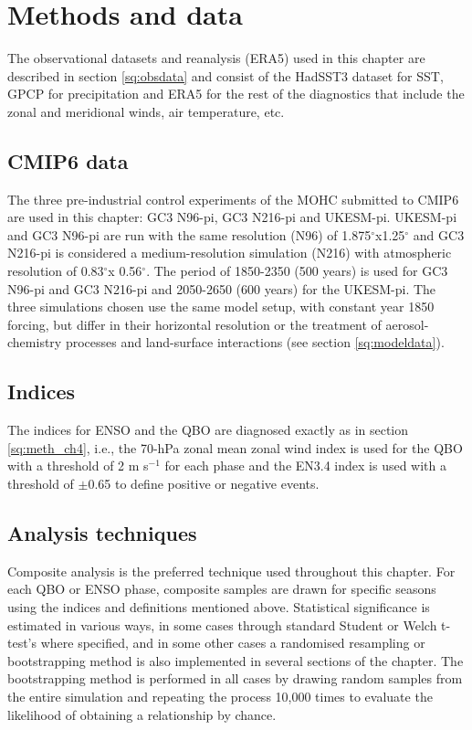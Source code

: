 \section{Methods and data}

The observational datasets and reanalysis (ERA5) used in this chapter are described in section \ref{sq:obsdata} and consist of the HadSST3 dataset for SST, GPCP for precipitation and ERA5 for the rest of the diagnostics that include the zonal and meridional winds, air temperature, etc.

\subsection{CMIP6 data}

The three pre-industrial control experiments of the MOHC submitted to CMIP6 are used in this chapter: GC3 N96-pi, GC3 N216-pi and UKESM-pi. UKESM-pi and GC3 N96-pi are run with the same resolution (N96) of 1.875$^\circ$x1.25$^\circ$ and GC3 N216-pi is considered a medium-resolution simulation (N216) with atmospheric resolution of 0.83$^\circ$x 0.56$^\circ$. The period of 1850-2350 (500 years) is used for GC3 N96-pi and GC3 N216-pi and 2050-2650 (600 years) for the UKESM-pi. 
The three simulations chosen use the same model setup, with constant year 1850 forcing, but differ in their horizontal resolution or the treatment of aerosol-chemistry processes and land-surface interactions (see section \ref{sq:modeldata}). 

\subsection{Indices}

The indices for ENSO and the QBO are diagnosed exactly as in section \ref{sq:meth_ch4}, i.e., the 70-hPa zonal mean zonal wind index is used for the QBO with a threshold of 2 m s$^{-1}$ for each phase and the EN3.4 index is used with a threshold of $\pm$0.65 to define positive or negative events.

\subsection{Analysis techniques}

Composite analysis is the preferred technique used throughout this chapter. For each QBO or ENSO phase, composite samples are drawn for specific seasons using the indices and definitions mentioned above. 
Statistical significance is estimated in various ways, in some cases through standard Student or Welch t-test's where specified, and in some other cases a randomised resampling or bootstrapping method is also implemented in several sections of the chapter. 
The bootstrapping method is performed in all cases by drawing random samples from the entire simulation and repeating the process 10,000 times to evaluate the likelihood of obtaining a relationship by chance. 

